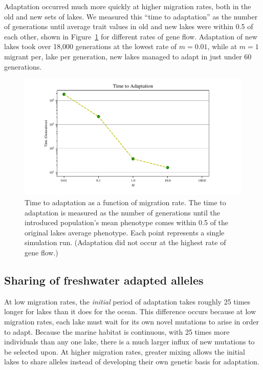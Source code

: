 \documentclass{article}
\begin{document}
Adaptation occurred much more quickly
at higher migration rates,
both in the old and new sets of lakes.
We measured this ``time to adaptation''
as the number of generations until 
average trait values in old and new lakes were within 0.5 of each other,
shown in Figure~\ref{fig:TimeToAdaptation} for different rates of gene flow.
Adaptation of new lakes took over 18,000 generations at the lowest rate of $m = 0.01$,
while at $m = 1$ migrant per, lake per generation,
new lakes managed to adapt in just under 60 generations. 

\begin{figure}
    \begin{center}
          \includegraphics{Final_Plots/Time_Adapt.pdf}
          \caption{
            Time to adaptation as a function of migration rate.
            The time to adaptation is measured as the number of generations until
            the introduced population's mean phenotype 
            comes within 0.5 of the original lakes average phenotype. 
            Each point represents a single simulation run.
            (Adaptation did not occur at the highest rate of gene flow.)
        } \label{fig:TimeToAdaptation}
    \end{center}
\end{figure}


\subsection*{Sharing of freshwater adapted alleles}

At low migration rates, the \emph{initial} period of adaptation
takes roughly 25 times longer for lakes than it does for the ocean.
This difference occurs because at low migration rates,
each lake must wait for its own novel mutations to arise in order to adapt.
Because the marine habitat is continuous, with 25 times more individuals than any one lake, 
there is a much larger influx of new mutations to be selected upon. 
At higher migration rates, greater mixing
allows the initial lakes to share alleles instead of developing their own genetic basis for adaptation. 
\end{document}
